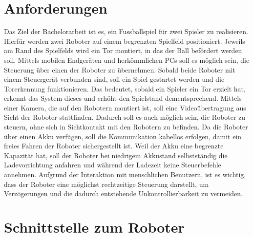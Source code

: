 \section{Anforderungen}
Das Ziel der Bachelorarbeit ist es, ein Fussballspiel für zwei Spieler zu realisieren. Hierfür werden zwei Roboter auf einem begrenzten Spielfeld positioniert. Jeweils am Rand des Spielfelds wird ein Tor montiert, in das der Ball befördert werden soll. Mittels mobilen Endgeräten und herkömmlichen PCs soll es möglich sein, die Steuerung über einen der Roboter zu übernehmen. Sobald beide Roboter mit einem Steuergerät verbunden sind, soll ein Spiel gestartet werden und die Torerkennung funktionieren. Das bedeutet, sobald ein Spieler ein Tor erzielt hat, erkennt das System dieses und erhöht den Spielstand dementsprechend. Mittels einer Kamera, die auf den Robotern montiert ist, soll eine Videoübertragung aus Sicht der Roboter stattfinden. Dadurch soll es auch möglich sein, die Roboter zu steuern, ohne sich in Sichtkontakt mit den Robotern zu befinden. Da die Roboter über einen Akku verfügen, soll die Kommunikation kabellos erfolgen, damit ein freies Fahren der Roboter sichergestellt ist. Weil der Akku eine begrenzte Kapazität hat, soll der Roboter bei niedrigem Akkustand selbstständig die Ladevorrichtung anfahren und während der Ladezeit keine Steuerbefehle annehmen. Aufgrund der Interaktion mit menschlichen Benutzern, ist es wichtig, dass der Roboter eine möglichst rechtzeitige Steuerung darstellt, um Verzögerungen und die dadurch entstehende Unkontrollierbarkeit zu vermeiden.


\section{Schnittstelle zum Roboter}

